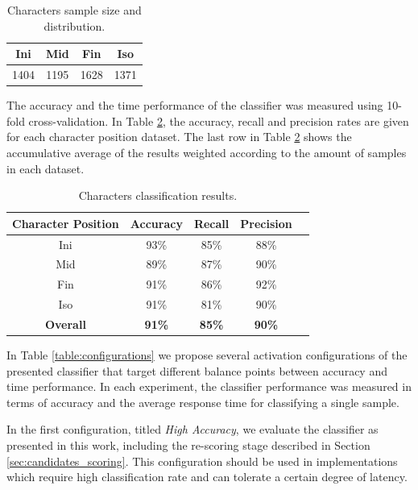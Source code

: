 \begin{table}
\centering
\caption{Characters sample size and distribution.}
\begin{tabular}{ c c c c }
  \toprule         
  \textbf{Ini} & \textbf{Mid} & \textbf{Fin} & \textbf{Iso} \\ 
  \midrule  
  1404 & 1195 & 1628 & 1371 \\
  \bottomrule
\end{tabular}
\label{table:sample_set} 
\end{table}

The accuracy and the time performance of the classifier was measured using 10-fold cross-validation.
In Table \ref{table:results_position}, the accuracy, recall and precision rates are given for each character position dataset.
The last row in Table \ref{table:results_position} shows the accumulative average of the results weighted according to the amount of samples in each dataset.

\begin{table}
\centering
\caption{Characters classification results.}
\renewcommand{\arraystretch}{1.2}
\begin{tabular}{c c c c c}
\toprule
	\textbf{Character Position} & \textbf{Accuracy} & \textbf{Recall} &  \textbf{Precision} \\
	\midrule
	Ini & 93\% & 85\% & 88\% \\                
  	Mid & 89\% & 87\% & 90\% \\
  	Fin & 91\% &  86\% & 92\% \\
  	Iso & 91\% &  81\% & 90\% \\
  	\midrule
  	\textbf{Overall} & \textbf{91\%} &  \textbf{85\%} & \textbf{90\%} \\
  	\bottomrule
\end{tabular}
\label{table:results_position} 
\end{table}

In Table \ref{table:configurations} we propose several activation configurations of the presented classifier that target different balance points between accuracy and time performance.
In each experiment, the classifier performance was measured in terms of accuracy and the average response time for classifying a single sample.

In the first configuration, titled \emph{High Accuracy}, we evaluate the classifier as presented in this work, including the re-scoring stage described in Section \ref{sec:candidates_scoring}.
This configuration should be used in implementations which require high classification rate and can tolerate a certain degree of latency.

